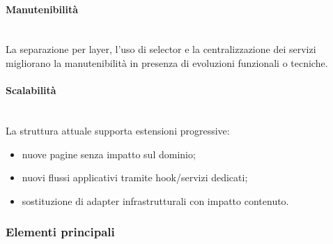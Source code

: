 \documentclass[a4paper,12pt]{article}
\begin{document}
            \paragraph{Manutenibilità}\mbox{}\\
                La separazione per layer, l'uso di selector e la centralizzazione dei servizi migliorano la manutenibilità in presenza di evoluzioni funzionali o tecniche.
                
            \paragraph{Scalabilità}\mbox{}\\
                La struttura attuale supporta estensioni progressive:
                \begin{itemize}
                    \item nuove pagine senza impatto sul dominio;
                    \item nuovi flussi applicativi tramite hook/servizi dedicati;
                    \item sostituzione di adapter infrastrutturali con impatto contenuto.
                \end{itemize}

        \subsubsection{Elementi principali}
\end{document}
